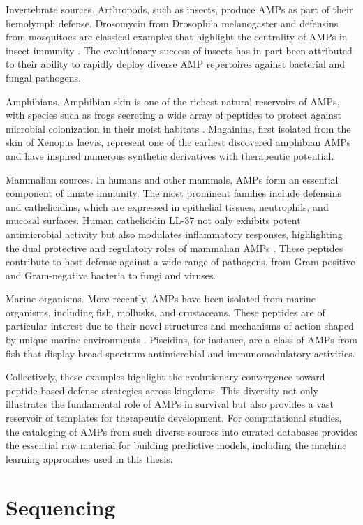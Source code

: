 \documentclass[a4paper,twoside,12pt]{book}
\begin{document}
Invertebrate sources. Arthropods, such as insects, produce AMPs as part of their hemolymph defense. Drosomycin from Drosophila melanogaster and defensins from mosquitoes are classical examples that highlight the centrality of AMPs in insect immunity \cite{bib:yi2014}. The evolutionary success of insects has in part been attributed to their ability to rapidly deploy diverse AMP repertoires against bacterial and fungal pathogens.

Amphibians. Amphibian skin is one of the richest natural reservoirs of AMPs, with species such as frogs secreting a wide array of peptides to protect against microbial colonization in their moist habitats \cite{bib:conlon2011}. Magainins, first isolated from the skin of Xenopus laevis, represent one of the earliest discovered amphibian AMPs and have inspired numerous synthetic derivatives with therapeutic potential.

Mammalian sources. In humans and other mammals, AMPs form an essential component of innate immunity. The most prominent families include defensins and cathelicidins, which are expressed in epithelial tissues, neutrophils, and mucosal surfaces. Human cathelicidin LL-37 not only exhibits potent antimicrobial activity but also modulates inflammatory responses, highlighting the dual protective and regulatory roles of mammalian AMPs \cite{bib:zanetti2004}. These peptides contribute to host defense against a wide range of pathogens, from Gram-positive and Gram-negative bacteria to fungi and viruses.

Marine organisms. More recently, AMPs have been isolated from marine organisms, including fish, mollusks, and crustaceans. These peptides are of particular interest due to their novel structures and mechanisms of action shaped by unique marine environments \cite{bib:li2019}. Piscidins, for instance, are a class of AMPs from fish that display broad-spectrum antimicrobial and immunomodulatory activities.

Collectively, these examples highlight the evolutionary convergence toward peptide-based defense strategies across kingdoms. This diversity not only illustrates the fundamental role of AMPs in survival but also provides a vast reservoir of templates for therapeutic development. For computational studies, the cataloging of AMPs from such diverse sources into curated databases provides the essential raw material for building predictive models, including the machine learning approaches used in this thesis.

\section{Sequencing}
\end{document}
